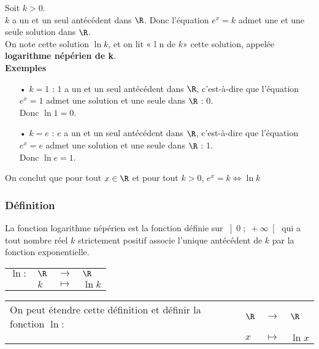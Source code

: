Soit $k > 0$. \\ $k$ a un et un seul antécédent dans $\R$. Donc l'équation $e^x = k$ admet une et une seule solution dans $\R$. \\ 
On note cette solution $\ln k$, et on lit « l n de $k$» cette solution, appelée \textbf{logarithme népérien de k}. \\

\textbf{Exemples} \\

\begin{itemize}
\item[•] $k = 1$ : $1$ a un et un seul antécédent dans $\R$, c'est-à-dire que l'équation $e^x = 1$ admet une solution et une seule dans $\R$ : $0$. \\ Donc $\ln 1 = 0$. \\
\item[•] $k = e$ : $e$ a un et un seul antécédent dans $\R$, c'est-à-dire que l'équation $e^x = e$ admet une solution et une seule dans $\R$ : $1$. \\ Donc $\ln e = 1$.
\end{itemize}

\vspace*{.3cm}

On conclut que pour tout $x \in \R$ et pour tout $k > 0$, $e^x = k \Longleftrightarrow \ln k$ 

\subsubsection{Définition}

La fonction logarithme népérien est la fonction définie sur $\left] 0 \; ; \; +\infty \right[$ qui a tout nombre réel $k$ strictement positif associe l'unique antécédent de $k$ par la fonction exponentielle. \\

\begin{tabular}{llll}
$\ln :$ & $\R$ & $\longrightarrow$ & $\R$ \\
& $k$ & $\longmapsto$ & $\ln k$ \\
\end{tabular}

\vspace*{.3cm}

\begin{tabular}{llll}
On peut étendre cette définition et définir la fonction  $\ln :$ & $\R$ & $\longrightarrow$ & $\R$ \\
& $x$ & $\longmapsto$ & $\ln x$ \\
\end{tabular}

